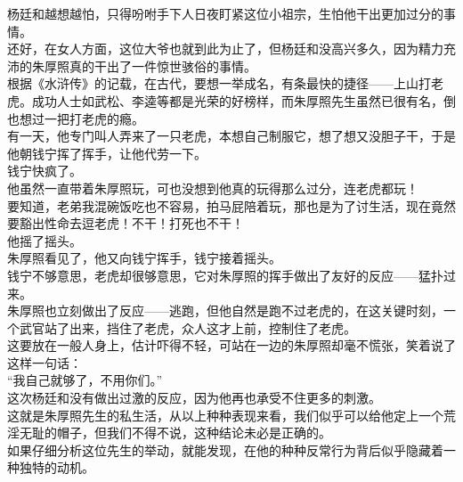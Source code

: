 \begin{multicols}{\theparacolNo}
杨廷和越想越怕，只得吩咐手下人日夜盯紧这位小祖宗，生怕他干出更加过分的事情。\\

还好，在女人方面，这位大爷也就到此为止了，但杨廷和没高兴多久，因为精力充沛的朱厚照真的干出了一件惊世骇俗的事情。\\

根据《水浒传》的记载，在古代，要想一举成名，有条最快的捷径——上山打老虎。成功人士如武松、李逵等都是光荣的好榜样，而朱厚照先生虽然已很有名，倒也想过一把打老虎的瘾。\\

有一天，他专门叫人弄来了一只老虎，本想自己制服它，想了想又没胆子干，于是他朝钱宁挥了挥手，让他代劳一下。\\

钱宁快疯了。\\

他虽然一直带着朱厚照玩，可也没想到他真的玩得那么过分，连老虎都玩！\\

要知道，老弟我混碗饭吃也不容易，拍马屁陪着玩，那也是为了讨生活，现在竟然要豁出性命去逗老虎！不干！打死也不干！\\

他摇了摇头。\\

朱厚照看见了，他又向钱宁挥手，钱宁接着摇头。\\

钱宁不够意思，老虎却很够意思，它对朱厚照的挥手做出了友好的反应——猛扑过来。\\

朱厚照也立刻做出了反应——逃跑，但他自然是跑不过老虎的，在这关键时刻，一个武官站了出来，挡住了老虎，众人这才上前，控制住了老虎。\\

这要放在一般人身上，估计吓得不轻，可站在一边的朱厚照却毫不慌张，笑着说了这样一句话：\\

“我自己就够了，不用你们。”\\

这次杨廷和没有做出过激的反应，因为他再也承受不住更多的刺激。\\

这就是朱厚照先生的私生活，从以上种种表现来看，我们似乎可以给他定上一个荒淫无耻的帽子，但我们不得不说，这种结论未必是正确的。\\

如果仔细分析这位先生的举动，就能发现，在他的种种反常行为背后似乎隐藏着一种独特的动机。\\


\end{multicols}
